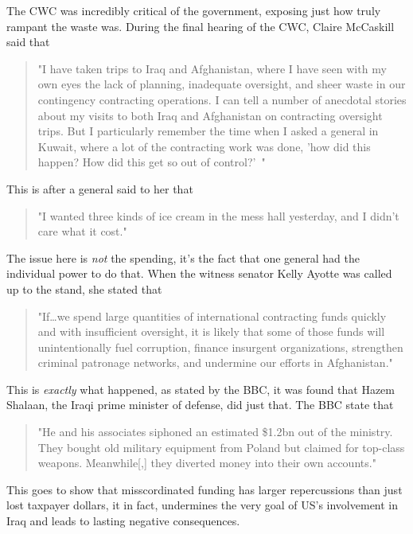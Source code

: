 \documentclass{article}
\begin{document}
        The CWC was incredibly critical of the government, exposing just how truly rampant the waste was. During the final hearing of the CWC, Claire McCaskill said that 
        \begin{quote}
            "I have taken trips to Iraq and Afghanistan, where I have seen with my own eyes the lack of planning, inadequate oversight, and sheer waste in our contingency contracting operations. I can tell a number of anecdotal stories about my visits to both Iraq and Afghanistan on contracting oversight trips. But I particularly remember the time when I asked a general in Kuwait, where a lot of the contracting work was done, 'how did this happen? How did this get so out of control?'~\cite{us_senate2011wartime_contracting}"
        \end{quote}
        This is after a general said to her that 
        \begin{quote}
            "I wanted three kinds of ice cream in the mess hall yesterday, and I didn't care what it cost."~\cite{us_senate2011wartime_contracting}
        \end{quote}
        The issue here is \textit{not} the spending, it's the fact that one general had the individual power to do that. 
        When the witness senator Kelly Ayotte was called up to the stand, she stated that \begin{quote}
            "If\ldots we spend large quantities of international contracting funds quickly and with insufficient oversight, it is likely  that some of those funds will unintentionally fuel corruption, finance insurgent organizations, strengthen criminal patronage networks, and undermine our efforts in Afghanistan." \cite{us_senate2011wartime_contracting}
        \end{quote}
        This is \textit{exactly} what happened, as stated by the BBC, it was found that Hazem Shalaan, the Iraqi prime minister of defense, did just that. The BBC state that
        \begin{quote}
            "He and his associates siphoned an estimated \$1.2bn out of the ministry. They bought old military equipment from Poland but claimed for top-class weapons. Meanwhile[,] they diverted money into their own accounts."
        \end{quote}
        This goes to show that misscordinated funding has larger repercussions than just lost taxpayer dollars, it in fact, undermines the very goal of US's involvement in Iraq and leads to lasting negative consequences. 
\end{document}
